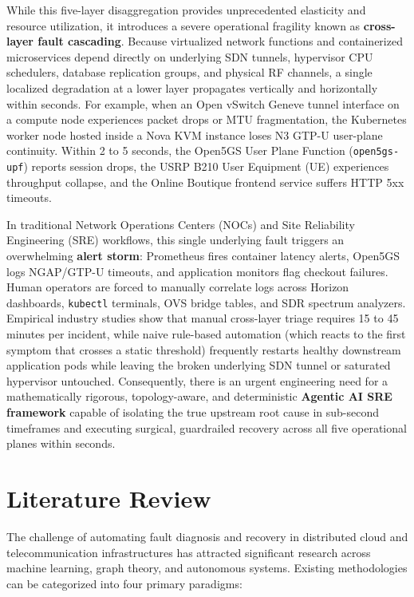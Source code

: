 While this five-layer disaggregation provides unprecedented elasticity and resource utilization, it introduces a severe operational fragility known as \textbf{cross-layer fault cascading}. Because virtualized network functions and containerized microservices depend directly on underlying SDN tunnels, hypervisor CPU schedulers, database replication groups, and physical RF channels, a single localized degradation at a lower layer propagates vertically and horizontally within seconds. For example, when an Open vSwitch Geneve tunnel interface on a compute node experiences packet drops or MTU fragmentation, the Kubernetes worker node hosted inside a Nova KVM instance loses N3 GTP-U user-plane continuity. Within 2 to 5 seconds, the Open5GS User Plane Function (\texttt{open5gs-upf}) reports session drops, the USRP B210 User Equipment (UE) experiences throughput collapse, and the Online Boutique frontend service suffers HTTP 5xx timeouts.

In traditional Network Operations Centers (NOCs) and Site Reliability Engineering (SRE) workflows, this single underlying fault triggers an overwhelming \textbf{alert storm}: Prometheus fires container latency alerts, Open5GS logs NGAP/GTP-U timeouts, and application monitors flag checkout failures. Human operators are forced to manually correlate logs across Horizon dashboards, \texttt{kubectl} terminals, OVS bridge tables, and SDR spectrum analyzers. Empirical industry studies show that manual cross-layer triage requires 15 to 45 minutes per incident, while naive rule-based automation (which reacts to the first symptom that crosses a static threshold) frequently restarts healthy downstream application pods while leaving the broken underlying SDN tunnel or saturated hypervisor untouched. Consequently, there is an urgent engineering need for a mathematically rigorous, topology-aware, and deterministic \textbf{Agentic AI SRE framework} capable of isolating the true upstream root cause in sub-second timeframes and executing surgical, guardrailed recovery across all five operational planes within seconds.

\section{Literature Review}
The challenge of automating fault diagnosis and recovery in distributed cloud and telecommunication infrastructures has attracted significant research across machine learning, graph theory, and autonomous systems. Existing methodologies can be categorized into four primary paradigms:

